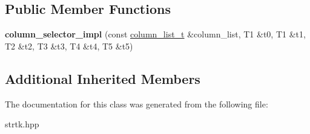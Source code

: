 \subsection*{Public Member Functions}
\begin{DoxyCompactItemize}
\item 
\hypertarget{classstrtk_1_1details_1_1column__selector__impl_3_01T0_00_01T1_00_01T2_00_01T3_00_01T4_00_01T5_01_4_acf6781afe0d6afc0c2ad8b812cf30c6d}{{\bfseries column\-\_\-selector\-\_\-impl} (const \hyperlink{structstrtk_1_1details_1_1column__list__impl}{column\-\_\-list\-\_\-t} \&column\-\_\-list, T1 \&t0, T1 \&t1, T2 \&t2, T3 \&t3, T4 \&t4, T5 \&t5)}\label{classstrtk_1_1details_1_1column__selector__impl_3_01T0_00_01T1_00_01T2_00_01T3_00_01T4_00_01T5_01_4_acf6781afe0d6afc0c2ad8b812cf30c6d}

\end{DoxyCompactItemize}
\subsection*{Additional Inherited Members}


The documentation for this class was generated from the following file\-:\begin{DoxyCompactItemize}
\item 
strtk.\-hpp\end{DoxyCompactItemize}
